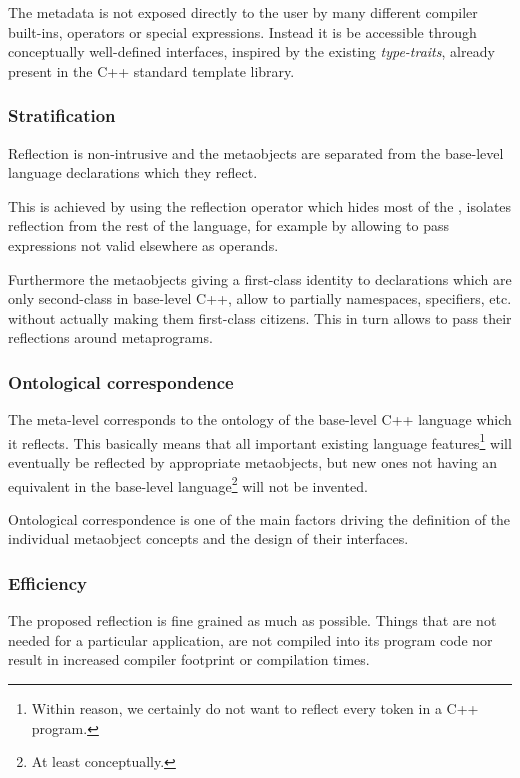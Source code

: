 The metadata is not exposed directly to the user by many different compiler
built-ins, operators or special expressions.
Instead it is be accessible through conceptually well-defined interfaces,
inspired by the existing {\em type-traits}, already present in
the C++ standard template library.

\subsubsection{Stratification}
\label{design-stratification}

Reflection is non-intrusive and the metaobjects are separated
from the base-level language declarations which they reflect.

This is achieved by using the reflection operator which hides most of the
, isolates reflection from the rest of the language,
for example by allowing to pass expressions not valid elsewhere as operands.

Furthermore the metaobjects giving a first-class identity to declarations
which are only second-class in base-level C++,
allow to partially  namespaces, specifiers, etc. without actually
making them first-class citizens. This in turn allows to pass their reflections around
metaprograms.

\subsubsection{Ontological correspondence}
\label{design-onto-corr}

The meta-level 
corresponds to the ontology of the base-level C++ language
which it reflects. This basically means that all important existing language
features\footnote{Within reason, we certainly do not want to reflect every token
in a C++ program.} will eventually be reflected by appropriate metaobjects,
but new ones not having an equivalent in the base-level language\footnote{At least
conceptually.} will not be invented.

Ontological correspondence is one of the main factors driving the definition of the
individual metaobject concepts and the design of their interfaces.


\subsubsection{Efficiency}
\label{design-efficiency}

The proposed reflection is fine grained as much as possible.
Things that are not needed for a particular application,
are not compiled into its program code nor result in
increased compiler footprint or compilation times.

